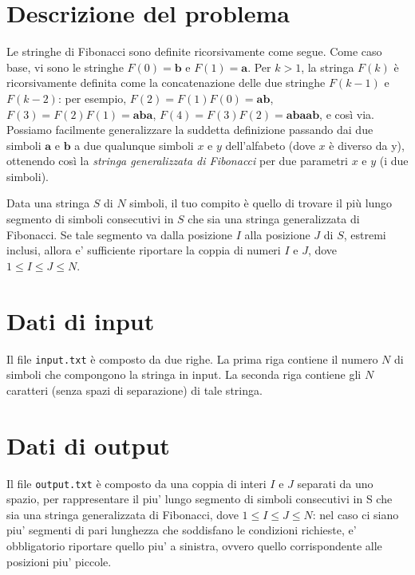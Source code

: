 \documentclass[a4paper,11pt]{article}
\begin{document}
\vspace{0.5cm}



\section*{Descrizione del problema}

Le stringhe di Fibonacci sono definite ricorsivamente come segue.
Come caso base, vi sono le stringhe $F(0) = \mathbf{b}$ e $F(1) = \mathbf{a}$. Per $k > 1$,
la stringa $F(k)$ è ricorsivamente definita come la concatenazione
delle due stringhe $F(k-1)$ e $F(k-2)$: per esempio, $F(2) = F(1) F(0) =
\mathbf{ab}$, $F(3) = F(2) F(1) = \mathbf{aba}$, $F(4) = F(3) F(2) = \mathbf{abaab}$, e così
via. Possiamo facilmente generalizzare la suddetta definizione
passando dai due simboli $\mathbf{a}$ e $\mathbf{b}$ a due qualunque simboli $x$ e $y$
dell'alfabeto (dove $x$ è diverso da y), ottenendo così la \emph{stringa
generalizzata di Fibonacci} per due parametri $x$ e $y$ (i due simboli).

Data una stringa $S$ di $N$ simboli, il tuo compito è quello
di trovare il più lungo segmento di simboli consecutivi in $S$ che sia
una stringa generalizzata di Fibonacci. Se tale segmento va dalla
posizione $I$ alla posizione $J$ di $S$, estremi
inclusi, allora e' sufficiente riportare la coppia di
numeri $I$ e $J$, dove $1 ≤ I ≤ J ≤ N$.


\section*{Dati di input}

Il file \texttt{input.txt} è composto da due righe. La
prima riga contiene il numero $N$ di simboli che compongono
la stringa in input. La seconda riga contiene gli $N$ caratteri
(senza spazi di separazione) di tale stringa.


\section*{Dati di output}

Il file \texttt{output.txt} è composto da una coppia di
interi $I$ e $J$ separati da uno spazio, per 
rappresentare il piu' lungo segmento di simboli consecutivi in S che sia
una stringa generalizzata di Fibonacci, dove $1 ≤ I ≤ J ≤
N$: nel caso ci siano piu' segmenti di pari lunghezza che
soddisfano le condizioni richieste, e' obbligatorio riportare quello
piu' a sinistra, ovvero quello corrispondente alle posizioni piu' piccole.
\end{document}

